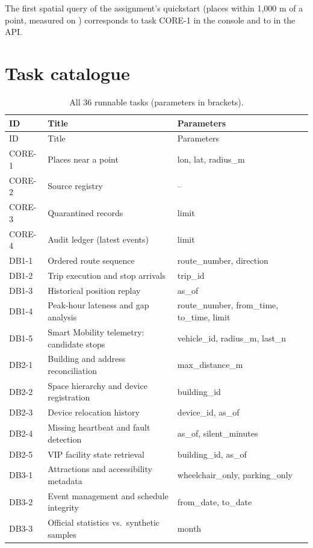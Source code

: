 \documentclass[11pt,a4paper]{article}
\newcommand{\cmd}[1]{\texttt{\detokenize{#1}}}
\begin{document}
The first spatial query of the assignment's quickstart (places within 1,000 m of a point,
measured on ) corresponds to task CORE-1 in the console and to
\cmd{GET /api/v1/core/places/nearby} in the API.

\section{Task catalogue}\label{app:tasks}

\begingroup\small
\begin{xltabular}{\linewidth}{@{}p{1.45cm}Xp{5.6cm}@{}}
\caption{All 36 runnable tasks (parameters in brackets).}\label{tab:tasks}\\
\toprule
ID & Title & Parameters \\
\midrule
\endfirsthead
\toprule
ID & Title & Parameters \\
\midrule
\endhead
\bottomrule
\endfoot
CORE-1 & Places near a point & lon, lat, radius\_m \\
CORE-2 & Source registry & -- \\
CORE-3 & Quarantined records & limit \\
CORE-4 & Audit ledger (latest events) & limit \\
DB1-1 & Ordered route sequence & route\_number, direction \\
DB1-2 & Trip execution and stop arrivals & trip\_id \\
DB1-3 & Historical position replay & as\_of \\
DB1-4 & Peak-hour lateness and gap analysis & route\_number, from\_time, to\_time, limit \\
DB1-5 & Smart Mobility telemetry: candidate stops & vehicle\_id, radius\_m, last\_n \\
DB2-1 & Building and address reconciliation & max\_distance\_m \\
DB2-2 & Space hierarchy and device registration & building\_id \\
DB2-3 & Device relocation history & device\_id, as\_of \\
DB2-4 & Missing heartbeat and fault detection & as\_of, silent\_minutes \\
DB2-5 & VIP facility state retrieval & building\_id, as\_of \\
DB3-1 & Attractions and accessibility metadata & wheelchair\_only, parking\_only \\
DB3-2 & Event management and schedule integrity & from\_date, to\_date \\
DB3-3 & Official statistics vs.\ synthetic samples & month \\

\end{xltabular}
\end{document}
